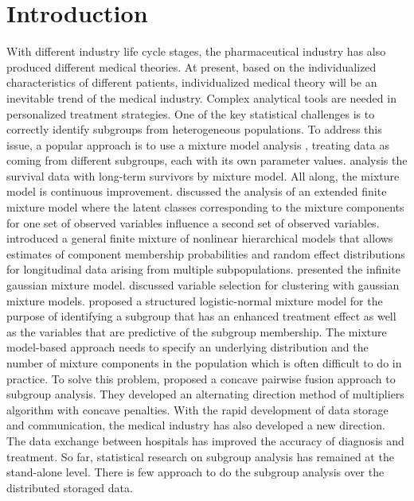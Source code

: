 \documentclass[review]{elsarticle}
\begin{document}
\section{Introduction}
With different industry life cycle stages, the pharmaceutical industry has also produced different medical theories. At present,  based on the individualized characteristics of different patients, individualized medical theory will be an inevitable trend of the medical industry. Complex analytical tools are needed in personalized treatment strategies. One of the key statistical challenges is to correctly identify subgroups from heterogeneous populations. To address this issue, a popular approach is to use a mixture model analysis \cite{everitt1981finite}, treating data as coming from different subgroups, each with its own parameter values. \cite{farewell1982use} analysis the survival data with long-term survivors by mixture model. All along, the mixture model is continuous improvement. \cite{muthen1999finite} discussed the analysis of an extended finite mixture model where the latent classes corresponding to the mixture components for one set of observed variables influence a second set of observed variables. \cite{pauler2000mixture} introduced a general finite mixture of nonlinear hierarchical models that allows estimates of component membership probabilities and random effect distributions for longitudinal data arising from multiple subpopulations. \cite{rasmussen2000infinite} presented the infinite gaussian mixture model. \cite{maugis2009variable} discussed variable selection for clustering with gaussian mixture models. \cite{shen2015inference} proposed a structured logistic-normal mixture model for the purpose of identifying a subgroup that has an enhanced treatment effect as well as the variables that are predictive of the subgroup membership. The mixture model-based approach needs to specify an underlying distribution and the number of mixture components in the population which is often difficult to do in practice. To solve this problem, \cite{ma2017concave} proposed a concave pairwise fusion approach to subgroup analysis. They developed an alternating direction method of multipliers algorithm with concave penalties. With the rapid development of data storage and communication, the medical industry has also developed a new direction. The data exchange between hospitals has improved the accuracy of diagnosis and treatment. So far, statistical research on subgroup analysis has remained at the stand-alone level. There is few approach to do the subgroup analysis over the distributed storaged data. 
\end{document}
